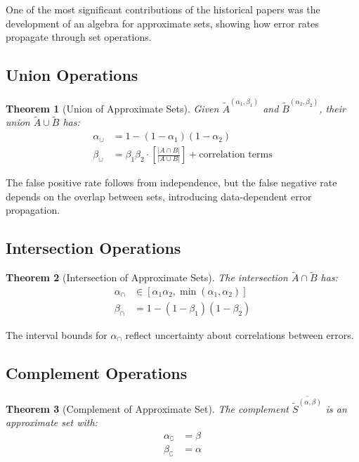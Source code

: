 \documentclass[11pt]{article}
\newtheorem{theorem}{Theorem}[section]
\newcommand{\observed}[1]{\tilde{#1}}  %
\newcommand{\card}[1]{|#1|}
\newcommand{\union}{\cup}
\newcommand{\intersection}{\cap}
\renewcommand{\complement}[1]{\overline{#1}}
\newcommand{\fprate}{\alpha}  %
\newcommand{\fnrate}{\beta}   %
\begin{document}
One of the most significant contributions of the historical papers was the development of an algebra for approximate sets, showing how error rates propagate through set operations.

\subsection{Union Operations}

\begin{theorem}[Union of Approximate Sets]
Given $\observed{A}^{(\fprate_1,\fnrate_1)}$ and $\observed{B}^{(\fprate_2,\fnrate_2)}$, their union $\observed{A} \union \observed{B}$ has:
\begin{align}
\fprate_{\union} &= 1 - (1-\fprate_1)(1-\fprate_2) \\
\fnrate_{\union} &= \fnrate_1 \fnrate_2 \cdot \left[\frac{\card{A \intersection B}}{\card{A \union B}}\right] + \text{correlation terms}
\end{align}
\end{theorem}

The false positive rate follows from independence, but the false negative rate depends on the overlap between sets, introducing data-dependent error propagation.

\subsection{Intersection Operations}

\begin{theorem}[Intersection of Approximate Sets]
The intersection $\observed{A} \intersection \observed{B}$ has:
\begin{align}
\fprate_{\intersection} &\in [\fprate_1 \fprate_2, \min(\fprate_1, \fprate_2)] \\
\fnrate_{\intersection} &= 1 - (1-\fnrate_1)(1-\fnrate_2)
\end{align}
\end{theorem}

The interval bounds for $\fprate_{\intersection}$ reflect uncertainty about correlations between errors.

\subsection{Complement Operations}

\begin{theorem}[Complement of Approximate Set]
The complement $\complement{\observed{S}^{(\fprate,\fnrate)}}$ is an approximate set with:
\begin{align}
\fprate_{\complement} &= \fnrate \\
\fnrate_{\complement} &= \fprate
\end{align}
\end{theorem}
\end{document}
